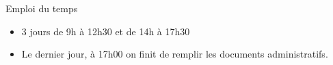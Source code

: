 \begin{frame}{Emploi du temps}
  \begin{itemize}
  \item 3 jours de 9h à 12h30 et de 14h à 17h30
  \item Le dernier jour, à 17h00 on finit de remplir les documents administratifs.
  \end{itemize}
\end{frame}
